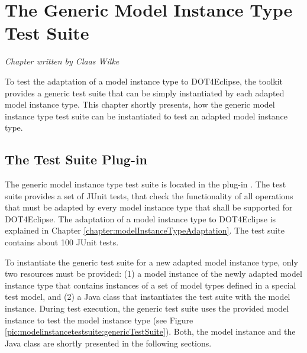 \chapter{The Generic Model Instance Type Test Suite}
\label{chapter:modelInstanceTestSuite}

\begin{flushright}
\textit{Chapter written by Claas Wilke}
\end{flushright}

To test the adaptation of a model instance type to \acl{DOT4Eclipse}, the toolkit provides a generic test suite that can be simply instantiated by each adapted model instance type. This chapter shortly presents, how the generic model instance type test suite can be instantiated to test an adapted model instance type.



\section{The Test Suite Plug-in}

The generic model instance type test suite is located in the plug-in . The test suite provides a set of JUnit tests, that check the functionality of all operations that must be adapted by every model instance type that shall be supported for \acl{DOT4Eclipse}. The adaptation of a model instance type to \acl{DOT4Eclipse} is explained in Chapter \ref{chapter:modelInstanceTypeAdaptation}. The test suite contains about 100 JUnit tests.

To instantiate the generic test suite for a new adapted model instance type, only two resources must be provided: (1) a model instance of the newly adapted model instance type that contains instances of a set of model types defined in a special test model, and (2) a Java class that instantiates the test suite with the model instance. During test execution, the generic test suite uses the provided model instance to test the model instance type (see Figure \ref{pic:modelinstancetestsuite:genericTestSuite}). Both, the model instance and the Java class are shortly presented in the following sections.

